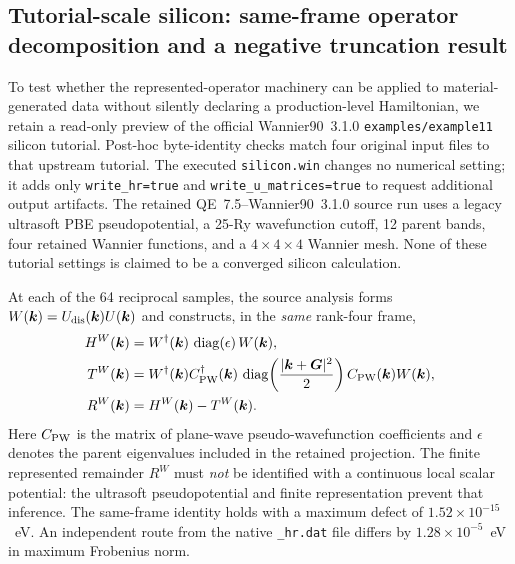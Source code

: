 \documentclass[11pt]{article}
\begin{document}
\subsection{Tutorial-scale silicon: same-frame operator decomposition and a negative truncation result}\label{sec:silicon}
To test whether the represented-operator machinery can be applied to material-generated data without silently declaring a production-level Hamiltonian, we retain a read-only preview of the official Wannier90~3.1.0 \texttt{examples/example11} silicon tutorial. Post-hoc byte-identity checks match four original input files to that upstream tutorial. The executed \texttt{silicon.win} changes no numerical setting; it adds only \texttt{write\_hr=true} and \texttt{write\_u\_matrices=true} to request additional output artifacts. The retained QE~7.5--Wannier90~3.1.0 source run uses a legacy ultrasoft PBE pseudopotential, a 25-Ry wavefunction cutoff, 12 parent bands, four retained Wannier functions, and a $4\times4\times4$ Wannier mesh. None of these tutorial settings is claimed to be a converged silicon calculation.

At each of the 64 reciprocal samples, the source analysis forms $W(\bm k)=U_{\rm dis}(\bm k)U(\bm k)$ and constructs, in the \emph{same} rank-four frame,
\begin{align}\label{eq:silicon}
 H^W(\bm k)&=W^\dagger(\bm k)\,\operatorname{diag}(\epsilon)\,W(\bm k),\\
 T^W(\bm k)&=W^\dagger(\bm k)C_{\rm PW}^\dagger(\bm k)\,\operatorname{diag}\!\left(\frac{|\bm k+\bm G|^2}{2}\right) C_{\rm PW}(\bm k)W(\bm k),\\
 R^W(\bm k)&=H^W(\bm k)-T^W(\bm k).
\end{align}
Here $C_{\rm PW}$ is the matrix of plane-wave pseudo-wavefunction coefficients and $\epsilon$ denotes the parent eigenvalues included in the retained projection. The finite represented remainder $R^W$ must \emph{not} be identified with a continuous local scalar potential: the ultrasoft pseudopotential and finite representation prevent that inference. The same-frame identity holds with a maximum defect of $1.52\times10^{-15}$~eV. An independent route from the native \texttt{\_hr.dat} file differs by $1.28\times10^{-5}$~eV in maximum Frobenius norm.
\end{document}

